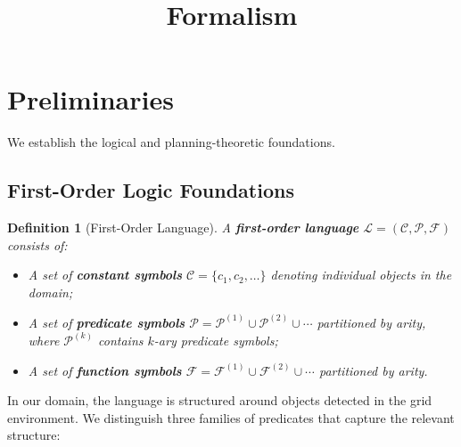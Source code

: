 \documentclass{article}
\title{Formalism}
\author{}
\newtheorem{definition}{Definition}
\newcommand{\calC}{\mathcal{C}}
\newcommand{\calF}{\mathcal{F}}
\newcommand{\calL}{\mathcal{L}}
\newcommand{\calP}{\mathcal{P}}
\begin{document}
\maketitle

\begin{abstract}

\end{abstract}



\section{Preliminaries}
\label{sec:preliminaries}

We establish the logical and planning-theoretic foundations.

\subsection{First-Order Logic Foundations}
\label{sec:fol}

\begin{definition}[First-Order Language]
\label{def:fol_language}
A \textbf{first-order language} $\calL = (\calC, \calP, \calF)$ consists of:
\begin{itemize}[nosep]
    \item A set of \textbf{constant symbols} $\calC = \{c_1, c_2, \ldots\}$ denoting individual objects in the domain;
    \item A set of \textbf{predicate symbols} $\calP = \calP^{(1)} \cup \calP^{(2)} \cup \cdots$ partitioned by arity, where $\calP^{(k)}$ contains $k$-ary predicate symbols;
    \item A set of \textbf{function symbols} $\calF = \calF^{(1)} \cup \calF^{(2)} \cup \cdots$ partitioned by arity.
\end{itemize}
\end{definition}

In our domain, the language is structured around objects detected in the grid environment.  We distinguish three families of predicates that capture the relevant structure:
\end{document}
